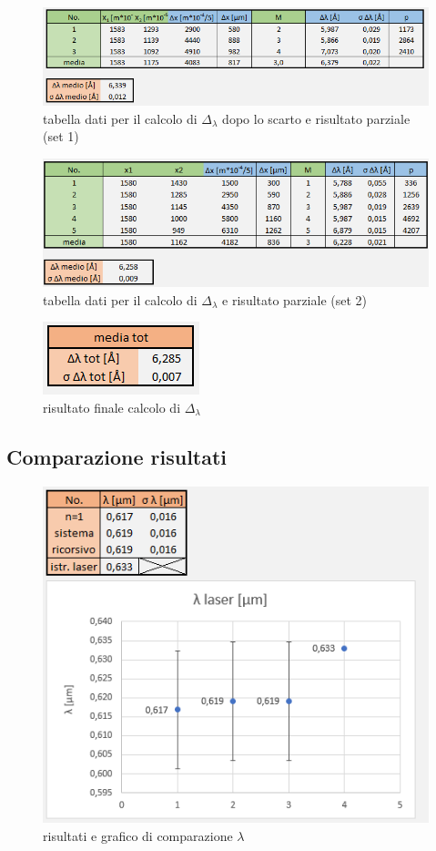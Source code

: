\documentclass{article}
\begin{document}
\begin{figure}[h!]
  \centering
  \includegraphics[width=0.75\linewidth]{IM tabella delta lambda set 1 scarto}
  \caption{tabella dati per il calcolo di $\Delta_\lambda$ dopo lo scarto e risultato parziale (set 1)}
\end{figure}

\begin{figure}[h!]
  \centering
  \includegraphics[width=0.75\linewidth]{IM tabella delta lambda set 2}
  \caption{tabella dati per il calcolo di $\Delta_\lambda$ e risultato parziale (set 2)}
\end{figure}

\begin{figure}[h!]
  \centering
  \includegraphics[width=0.25\linewidth]{IM risultati delta lambda}
  \caption{risultato finale calcolo di $\Delta_\lambda$}
\end{figure}

\subsection{Comparazione risultati}

\begin{figure}[h!]
  \centering
  \includegraphics[width=0.6\linewidth]{IM comparazione lambda}
  \caption{risultati e grafico di comparazione $\lambda$}
\end{figure}
\end{document}
